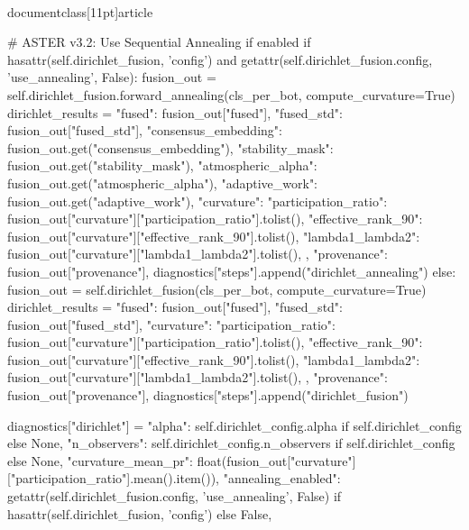 \\documentclass[11pt]{article}
\begin{document}
\begin{CodeBlock}
                    # ASTER v3.2: Use Sequential Annealing if enabled
                    if hasattr(self.dirichlet_fusion, 'config') and getattr(self.dirichlet_fusion.config, 'use_annealing', False):
                        fusion_out = self.dirichlet_fusion.forward_annealing(cls_per_bot, compute_curvature=True)
                        dirichlet_results = {
                            "fused": fusion_out["fused"],
                            "fused_std": fusion_out["fused_std"],
                            "consensus_embedding": fusion_out.get("consensus_embedding"),
                            "stability_mask": fusion_out.get("stability_mask"),
                            "atmospheric_alpha": fusion_out.get("atmospheric_alpha"),
                            "adaptive_work": fusion_out.get("adaptive_work"),
                            "curvature": {
                                "participation_ratio": fusion_out["curvature"]["participation_ratio"].tolist(),
                                "effective_rank_90": fusion_out["curvature"]["effective_rank_90"].tolist(),
                                "lambda1_lambda2": fusion_out["curvature"]["lambda1_lambda2"].tolist(),
                            },
                            "provenance": fusion_out["provenance"],
                        }
                        diagnostics["steps"].append("dirichlet_annealing")
                    else:
                        fusion_out = self.dirichlet_fusion(cls_per_bot, compute_curvature=True)
                        dirichlet_results = {
                            "fused": fusion_out["fused"],
                            "fused_std": fusion_out["fused_std"],
                            "curvature": {
                                "participation_ratio": fusion_out["curvature"]["participation_ratio"].tolist(),
                                "effective_rank_90": fusion_out["curvature"]["effective_rank_90"].tolist(),
                                "lambda1_lambda2": fusion_out["curvature"]["lambda1_lambda2"].tolist(),
                            },
                            "provenance": fusion_out["provenance"],
                        }
                        diagnostics["steps"].append("dirichlet_fusion")

                    diagnostics["dirichlet"] = {
                        "alpha": self.dirichlet_config.alpha if self.dirichlet_config else None,
                        "n_observers": self.dirichlet_config.n_observers if self.dirichlet_config else None,
                        "curvature_mean_pr": float(fusion_out["curvature"]["participation_ratio"].mean().item()),
                        "annealing_enabled": getattr(self.dirichlet_fusion.config, 'use_annealing', False) if hasattr(self.dirichlet_fusion, 'config') else False,
                    }


\end{CodeBlock}
\end{document}
